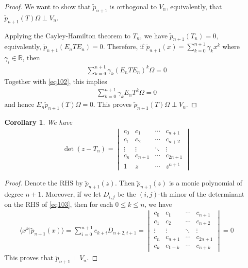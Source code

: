 \documentclass[12pt,b5paper,notitlepage]{article}
\theoremstyle{definition}
\theoremstyle{plain}
\newtheorem{co}[df]{Corollary}
\newcommand{\wtd}{\widetilde}
\newcommand{\bk}[1]{\langle {#1}\rangle}
\newcommand{\Rbb}{\mathbb R}
\numberwithin{equation}{section}
\begin{document}
\begin{proof}
We want to show that $\wtd p_{n+1}$ is orthogonal to $V_n$, equivalently, that $\wtd p_{n+1}(T)\Omega\perp V_n$.

Applying the Cayley-Hamilton theorem to $T_n$, we have $\wtd p_{n+1}(T_n)=0$, equivalently, $\wtd p_{n+1}(E_nTE_n)=0$. Therefore, if $\wtd p_{n+1}(x)=\sum_{k=0}^{n+1} \gamma_kx^k$ where $\gamma_i\in\Rbb$, then
\begin{align*}
\sum_{k=0}^{n+1} \gamma_k (E_nTE_n)^k\Omega=0
\end{align*}
Together with \eqref{eq102}, this implies
\begin{align*}
\sum_{k=0}^{n+1} \gamma_k E_nT^k\Omega=0
\end{align*}
and hence $E_n\wtd p_{n+1}(T)\Omega=0$. This proves $\wtd p_{n+1}(T)\Omega\perp V_n$.
\end{proof}


\begin{co}
We have
\begin{align}\label{eq103}
\det(z-T_n)=
\begin{vmatrix}
c_0&c_1&\cdots&c_{n+1}\\
c_1&c_2&\cdots&c_{n+2}\\
\vdots&\vdots&\ddots&\vdots\\
c_n&c_{n+1}&\cdots&c_{2n+1}\\
1&z&\cdots& z^{n+1}
\end{vmatrix}
\end{align}
\end{co}

\begin{proof}
Denote the RHS by $\wtd p_{n+1}(z)$. Then $\wtd p_{n+1}(z)$ is a monic polynomial of degree $n+1$. Moreover, if we let $D_{i,j}$ be the $(i,j)$-th minor of the determinant on the RHS of \eqref{eq103}, then for each $0\leq k\leq n$, we have
\begin{align*}
\bk{x^k|\wtd p_{n+1}(x)}=\sum_{i=0}^{n+1}c_{k+i}D_{n+2,i+1}=\begin{vmatrix}
c_0&c_1&\cdots&c_{n+1}\\
c_1&c_2&\cdots&c_{n+2}\\
\vdots&\vdots&\ddots&\vdots\\
c_n&c_{n+1}&\cdots&c_{2n+1}\\
c_k&c_{1+k}&\cdots& c_{n+k}
\end{vmatrix}=0
\end{align*}
This proves that $\wtd p_{n+1}\perp V_n$.
\end{proof}
\end{document}

